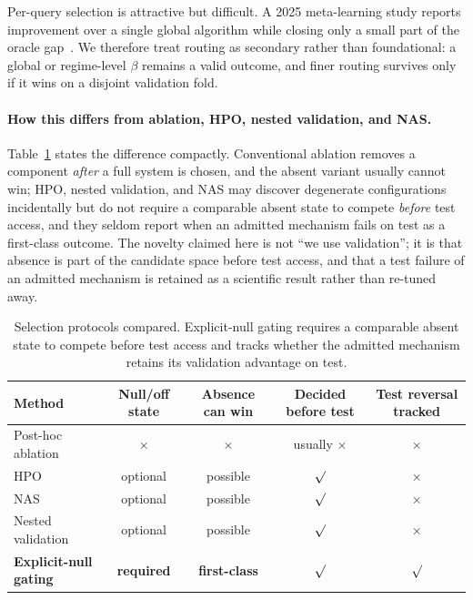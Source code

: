 \documentclass[runningheads]{llncs}
\begin{document}
Per-query selection is attractive but difficult. A 2025 meta-learning study
reports improvement over a single global algorithm while closing only a small
part of the oracle gap~\cite{algselect2025}. We therefore treat routing as
secondary rather than foundational: a global or regime-level $\beta$ remains a
valid outcome, and finer routing survives only if it wins on a disjoint
validation fold.

\paragraph{How this differs from ablation, HPO, nested validation, and NAS.}
Table~\ref{tab:vs-selection} states the difference compactly. Conventional
ablation removes a component \emph{after} a full system is chosen, and the
absent variant usually cannot win; HPO, nested validation, and NAS may
discover degenerate configurations incidentally but do not require a
comparable absent state to compete \emph{before} test access, and they
seldom report when an admitted mechanism fails on test as a first-class
outcome. The novelty claimed here is not ``we use validation''; it is that
absence is part of the candidate space before test access, and that a test
failure of an admitted mechanism is retained as a scientific result rather
than re-tuned away.

\begin{table}[t]
\caption{Selection protocols compared. Explicit-null gating requires a
comparable absent state to compete before test access and tracks whether the
admitted mechanism retains its validation advantage on test.}
\label{tab:vs-selection}\centering\scriptsize
\setlength{\tabcolsep}{3pt}
\begin{tabular}{lcccc}
\toprule
Method & Null/off state & Absence can win & Decided before test & Test reversal tracked\\
\midrule
Post-hoc ablation & $\times$ & $\times$ & usually $\times$ & $\times$\\
HPO & optional & possible & $\surd$ & $\times$\\
NAS & optional & possible & $\surd$ & $\times$\\
Nested validation & optional & possible & $\surd$ & $\times$\\
\textbf{Explicit-null gating} & \textbf{required} & \textbf{first-class} & \textbf{$\surd$} & \textbf{$\surd$}\\
\bottomrule
\end{tabular}
\end{table}
\end{document}
